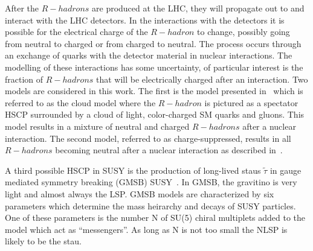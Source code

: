 After the $R-hadrons$ are produced at the LHC, they will propagate out to and interact with the LHC detectors. In the interactions with the
detectors it is possible for the electrical charge of the $R-hadron$ to change, possibly going from neutral
to charged or from charged to neutral. The process occurs through an exchange of quarks with the detector material in nuclear interactions.
The modelling of these interactions has some uncertainty, of particular interest is the fraction of $R-hadrons$ that will be electrically charged after an interaction.
Two models are considered in this work.
The first is the model presented in~\cite{Kraan:2004tz, Mackeprang:2006gx} 
which is referred to as the cloud model where the $R-hadron$ is pictured as a spectator HSCP surrounded by a cloud of light, color-charged SM quarks and gluons.
This model results in a mixture of neutral and charged $R-hadrons$ after a nuclear interaction.
The second model, referred to as charge-suppressed, results in all $R-hadrons$ becoming neutral after a nuclear interaction as described in~\cite{Mackeprang:2009ad}.


A third possible HSCP in SUSY  is the production of long-lived staus $\tilde{\tau}$ in gauge mediated symmetry breaking (GMSB) SUSY~\cite{Giudice:1998bp}. 
In GMSB, the gravitino is very light and almost always the LSP.
GMSB models are characterized by six parameters which determine the mass heirarchy and decays of SUSY particles.
One of these parameters is the number N of SU(5) chiral multiplets added to the model which act as ``messengers''.
As long as N is not too small the NLSP is likely to be the stau.

